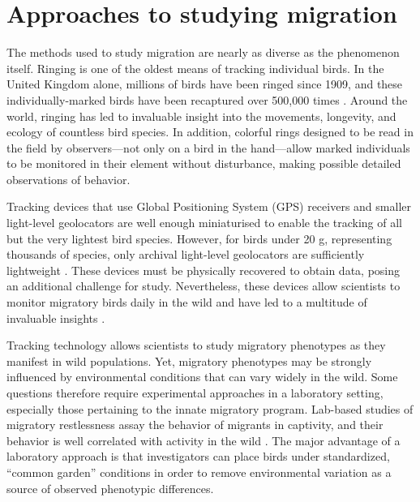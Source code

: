 \documentclass[a4paper, nobind]{templates/ociamthesis}
\begin{document}
\hypertarget{approaches-to-studying-migration}{%
\section*{Approaches to studying migration}\label{approaches-to-studying-migration}}

The methods used to study migration are nearly as diverse as the phenomenon itself. Ringing is one of the oldest means of tracking individual birds. In the United Kingdom alone, millions of birds have been ringed since 1909, and these individually-marked birds have been recaptured over 500,000 times \autocite{wernhamMigrationAtlasMovements2002}. Around the world, ringing has led to invaluable insight into the movements, longevity, and ecology of countless bird species. In addition, colorful rings designed to be read in the field by observers---not only on a bird in the hand---allow marked individuals to be monitored in their element without disturbance, making possible detailed observations of behavior.

Tracking devices that use Global Positioning System (GPS) receivers and smaller light-level geolocators \autocite{lisovskiGeolocationLightAccuracy2012,rakhimberdievComparingInferencesSolar2016,ekstromAdvanceGeolocationLight2004} are well enough miniaturised to enable the tracking of all but the very lightest bird species. However, for birds under 20 g, representing thousands of species, only archival light-level geolocators are sufficiently lightweight \autocite{lopez-lopezIndividualbasedTrackingSystems2016}. These devices must be physically recovered to obtain data, posing an additional challenge for study. Nevertheless, these devices allow scientists to monitor migratory birds daily in the wild and have led to a multitude of invaluable insights \autocite{mckinnonTenYearsTracking2018}.

Tracking technology allows scientists to study migratory phenotypes as they manifest in wild populations. Yet, migratory phenotypes may be strongly influenced by environmental conditions that can vary widely in the wild. Some questions therefore require experimental approaches in a laboratory setting, especially those pertaining to the innate migratory program. Lab-based studies of migratory restlessness assay the behavior of migrants in captivity, and their behavior is well correlated with activity in the wild \autocite{bertholdBirdMigrationGeneral2001}. The major advantage of a laboratory approach is that investigators can place birds under standardized, ``common garden'' conditions in order to remove environmental variation as a source of observed phenotypic differences.
\end{document}
